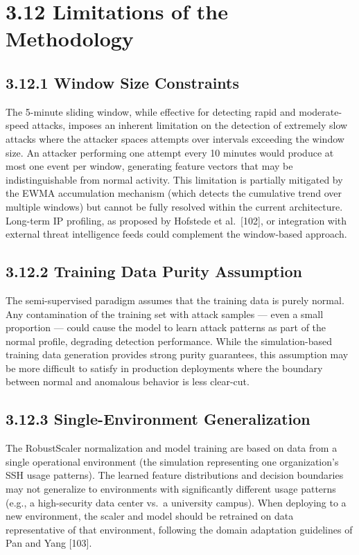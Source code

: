 \documentclass[
  a4paper]{report}
\begin{document}
\section{3.12 Limitations of the
Methodology}\label{limitations-of-the-methodology}

\subsection{3.12.1 Window Size
Constraints}\label{window-size-constraints}

The 5-minute sliding window, while effective for detecting rapid and
moderate-speed attacks, imposes an inherent limitation on the detection
of extremely slow attacks where the attacker spaces attempts over
intervals exceeding the window size. An attacker performing one attempt
every 10 minutes would produce at most one event per window, generating
feature vectors that may be indistinguishable from normal activity. This
limitation is partially mitigated by the EWMA accumulation mechanism
(which detects the cumulative trend over multiple windows) but cannot be
fully resolved within the current architecture. Long-term IP profiling,
as proposed by Hofstede et al.~{[}102{]}, or integration with external
threat intelligence feeds could complement the window-based approach.

\subsection{3.12.2 Training Data Purity
Assumption}\label{training-data-purity-assumption}

The semi-supervised paradigm assumes that the training data is purely
normal. Any contamination of the training set with attack samples ---
even a small proportion --- could cause the model to learn attack
patterns as part of the normal profile, degrading detection performance.
While the simulation-based training data generation provides strong
purity guarantees, this assumption may be more difficult to satisfy in
production deployments where the boundary between normal and anomalous
behavior is less clear-cut.

\subsection{3.12.3 Single-Environment
Generalization}\label{single-environment-generalization}

The RobustScaler normalization and model training are based on data from
a single operational environment (the simulation representing one
organization's SSH usage patterns). The learned feature distributions
and decision boundaries may not generalize to environments with
significantly different usage patterns (e.g., a high-security data
center vs.~a university campus). When deploying to a new environment,
the scaler and model should be retrained on data representative of that
environment, following the domain adaptation guidelines of Pan and Yang
{[}103{]}.
\end{document}

